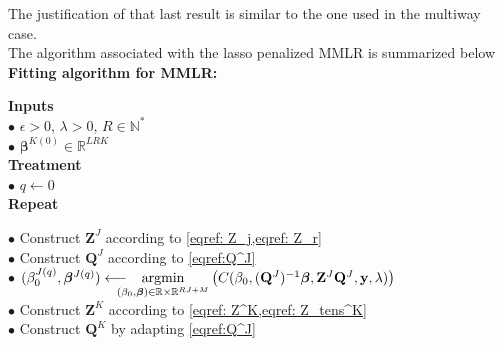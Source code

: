 \documentclass[preprint,12pt]{elsarticle}
\begin{document}
\noindent The justification of that last result is similar to the one used in the multiway case.\\[10 pt]
The algorithm associated with the lasso penalized MMLR is summarized below\\[5 pt]

{\fontsize{12}{8}\selectfont \noindent \textbf{Fitting algorithm for MMLR:}}\\[1 pt]
\begin{mdframed}[leftmargin=0cm, rightmargin=0.2cm]
    \noindent \textbf{Inputs}\\
    \phantom{a}\hspace{5 pt} $\bullet$ $\epsilon >0$, $\lambda >0$, $R \in \mathbb{N}^{*}$\\[2 pt]
    \phantom{a}\hspace{5 pt} $\bullet$ $\bm{\beta}^{K(0)} \in \mathbb{R}^{LRK}$\\[4 pt]
    \textbf{Treatment}\\
    \phantom{a}\hspace{5 pt} $\bullet$ $q \leftarrow 0$\\[2 pt]
    \phantom{a}\hspace{5 pt}  \textbf{Repeat}\\[2 pt]
    \phantom{a}\hspace{22 pt} $\bullet$ Construct $\mathbf{Z}^J$ according to \cref{eqref: Z_j,eqref: Z_r}\\[2 pt]
    \phantom{a}\hspace{25 pt} $\bullet$ Construct $\mathbf{Q}^J$ according to \cref{eqref:Q^J}\\[2 pt]
    \phantom{a}\hspace{25 pt}  $\bullet$ $(\beta_0^{J {(q)}}, \bm{\beta}^{J {(q)}}) \longleftarrow \hspace{-10 pt} \underset{(\beta_0, \bm{\beta}) \in \mathbb{R} \times \mathbb{R}^{RJ + M}}{\text{argmin}} \left( C(\beta_0, (\mathbf{Q}^J)^{-1}\bm{\beta},\mathbf{Z}^J \mathbf{Q}^J, \mathbf{y}, \lambda) \right)$\\[2 pt]
    \phantom{a}\hspace{25 pt} $\bullet$ Construct $\mathbf{Z}^K$ according to \cref{eqref: Z^K,eqref: Z_tens^K}\\[3 pt]
    \phantom{a}\hspace{25 pt} $\bullet$ Construct $\mathbf{Q}^K$ by adapting \cref{eqref:Q^J}\\[2 pt]

\end{mdframed}
\end{document}
